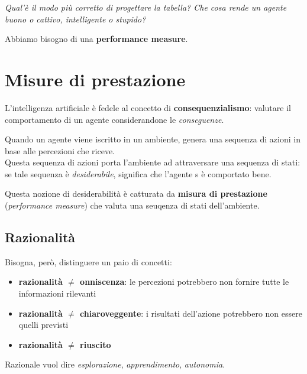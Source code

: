 \documentclass[12pt, a4paper, oneside]{book}
\begin{document}
    \textit{Qual'è il modo più corretto di progettare la tabella? Che cosa rende un agente buono o cattivo, intelligente o stupido?}

    Abbiamo bisogno di una \textbf{performance measure}.

    \section{Misure di prestazione}
    L'intelligenza artificiale è fedele al concetto di \textbf{consequenzialismo}: valutare il comportamento di un agente considerandone le \textit{conseguenze}.

    Quando un agente viene iscritto in un ambiente, genera una sequenza di azioni in base alle percezioni che riceve. \\[0.5ex]
    Questa sequenza di azioni porta l'ambiente ad attraversare una sequenza di stati: se tale sequenza è \textit{desiderabile}, significa che l'agente s è comportato bene.

    Questa nozione di desiderabilità è catturata da \textbf{misura di prestazione} (\textit{performance measure}) che valuta una seuqenza di stati dell'ambiente.

    \subsection{Razionalità}

    Bisogna, però, distinguere un paio di concetti:
    \begin{itemize}
      \item \textbf{razionalità $\neq$ onniscenza}: le percezioni potrebbero non fornire tutte le informazioni rilevanti
      \item \textbf{razionalità $\neq$ chiaroveggente}: i risultati dell'azione potrebbero non essere quelli previsti
      \item \textbf{razionalità $\neq$ riuscito}
    \end{itemize}

    Razionale vuol dire \textit{esplorazione}, \textit{apprendimento}, \textit{autonomia}.
\end{document}
